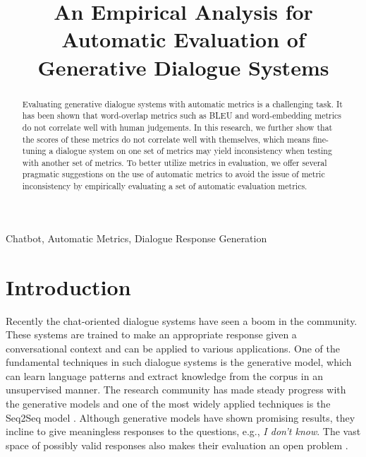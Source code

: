 \documentclass[conference]{IEEEtran}
\begin{document}
\title{An Empirical Analysis for Automatic Evaluation of Generative Dialogue Systems}

\author{
}

\maketitle

\begin{abstract}
Evaluating generative dialogue systems with automatic metrics is a challenging task.
It has been shown that word-overlap metrics such as BLEU and word-embedding metrics do not correlate well with human judgements.
In this research, we further show that the scores of these metrics do not correlate well with themselves, which means fine-tuning a dialogue system on one set of metrics may yield inconsistency when testing with another set of metrics.
To better utilize metrics in evaluation, we offer several pragmatic suggestions on the use of automatic metrics to avoid the issue of metric inconsistency by empirically evaluating a set of automatic evaluation metrics.
\end{abstract}

\begin{IEEEkeywords}
Chatbot, Automatic Metrics, Dialogue Response Generation
\end{IEEEkeywords}

\section{Introduction}
Recently the chat-oriented dialogue systems have seen a boom in the community.
These systems are trained to make an appropriate response given a conversational context and can be applied to various applications.
One of the fundamental techniques in such dialogue systems is the generative model, which can learn language patterns and extract knowledge from the corpus in an unsupervised manner.
The research community has made steady progress with the generative models and one of the most widely applied techniques is the Seq2Seq model \cite{Seq2Seq}.
Although generative models have shown promising results, they incline to give meaningless responses to the questions, e.g., \textit{I don't know}.
The vast space of possibly valid responses also makes their evaluation an open problem \cite{HowNot}.
\end{document}
